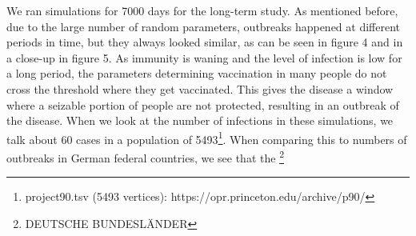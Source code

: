 \documentclass[11pt]{article}
\begin{document}
We ran simulations for 7000 days for the long-term study. As mentioned before, due to the large number of random parameters, outbreaks happened at different periods in time, but they always looked similar, as can be seen in figure 4 and in a close-up in figure 5. As immunity is waning and the level of infection is low for a long period, the parameters determining vaccination in many people do not cross the threshold where they get vaccinated. This gives the disease a window where a seizable portion of people are not protected, resulting in an outbreak of the disease. When we look at the number of infections in these simulations, we talk about 60 cases in a population of 5493\footnote{project90.tsv (5493 vertices): https://opr.princeton.edu/archive/p90/}. When comparing  this to numbers of outbreaks in German federal countries, we see that the \footnote{DEUTSCHE BUNDESLÄNDER}
\end{document}
